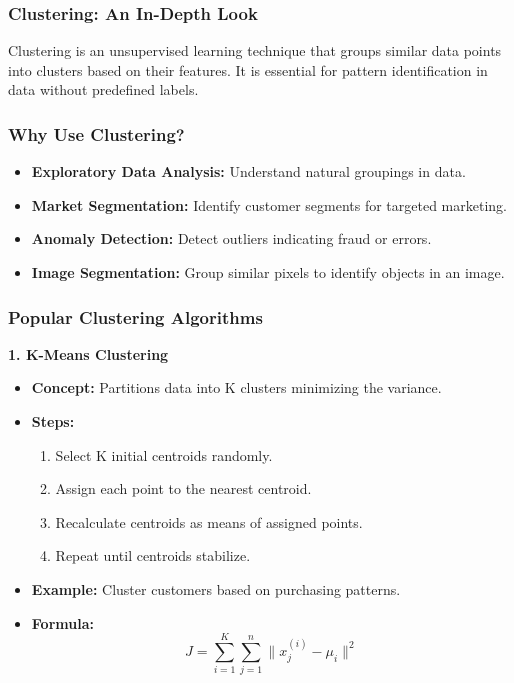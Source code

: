 \documentclass[aspectratio=169]{beamer}
\begin{document}
\begin{frame}[fragile]
    \frametitle{Clustering: An In-Depth Look}
    Clustering is an unsupervised learning technique that groups similar data points into clusters based on their features. It is essential for pattern identification in data without predefined labels.
\end{frame}

\begin{frame}[fragile]
    \frametitle{Why Use Clustering?}
    \begin{itemize}
        \item \textbf{Exploratory Data Analysis:} Understand natural groupings in data.
        \item \textbf{Market Segmentation:} Identify customer segments for targeted marketing.
        \item \textbf{Anomaly Detection:} Detect outliers indicating fraud or errors.
        \item \textbf{Image Segmentation:} Group similar pixels to identify objects in an image.
    \end{itemize}
\end{frame}

\begin{frame}[fragile]
    \frametitle{Popular Clustering Algorithms}
    \textbf{1. K-Means Clustering}
    \begin{itemize}
        \item \textbf{Concept:} Partitions data into K clusters minimizing the variance.
        \item \textbf{Steps:}
        \begin{enumerate}
            \item Select K initial centroids randomly.
            \item Assign each point to the nearest centroid.
            \item Recalculate centroids as means of assigned points.
            \item Repeat until centroids stabilize.
        \end{enumerate}
        \item \textbf{Example:} Cluster customers based on purchasing patterns.
        \item \textbf{Formula:} 
        \begin{equation}
            J = \sum_{i=1}^{K} \sum_{j=1}^{n} \| x_j^{(i)} - \mu_i \|^2
        \end{equation}
    \end{itemize}
\end{frame}
\end{document}
